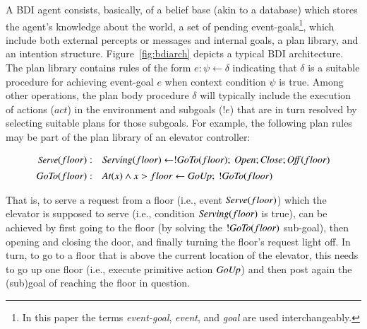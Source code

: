 A BDI agent consists, basically, of a belief base (akin to a database) which
stores the agent's knowledge about the world, a set of pending
event-goals\footnote{In this paper the terms {\em event-goal}, {\em event}, and
{\em goal} are used interchangeably.}, which include both external percepts or
messages and internal goals, a plan library, and an intention structure.
Figure~\ref{fig:bdiarch} depicts a typical BDI architecture.
The plan library contains rules of the form $e: \psi \leftarrow \delta$
indicating that $\delta$ is a suitable procedure for achieving event-goal $e$
when context condition $\psi$ is true.
Among other operations, the plan body procedure $\delta$ will typically include
the execution of actions ($act$) in the environment and subgoals ($!e$) that are
in turn resolved by selecting suitable plans for those subgoals.
For example, the following plan rules may be part of the plan library of an
elevator controller:

\[
\begin{array}{rl}\small
\mbox{\textit{Serve}}(floor)  : &  \mbox{\textit{Serving}}(floor) \leftarrow 
	!\mbox{\textit{GoTo}}(floor);\ \mbox{\textit{Open}}; \mbox{\textit{Close}}; \mbox{\textit{Off}}(floor) \\[1ex] 
\mbox{\textit{GoTo}}(floor)  : & \mbox{\textit{At}}(x) \land x>floor \leftarrow \mbox{\textit{GoUp}};\ !\mbox{\textit{GoTo}}(floor)
\end{array}
\]

That is, to serve a request from a floor (i.e., event $\mbox{\textit{Serve}}(floor)$)
which the elevator is supposed to serve (i.e., condition $\mbox{\textit{Serving}}(floor)$ is
true), can be achieved by first going to the floor (by solving the
$!\mbox{\textit{GoTo}}(floor)$ sub-goal), then opening and closing the door, and finally
turning the floor's request light off.
In turn, to go to a floor that is above the current location of the elevator,
this needs to go up one floor (i.e., execute primitive action $\mbox{\textit{GoUp}}$) and then
post again the (sub)goal of reaching the floor in question.





